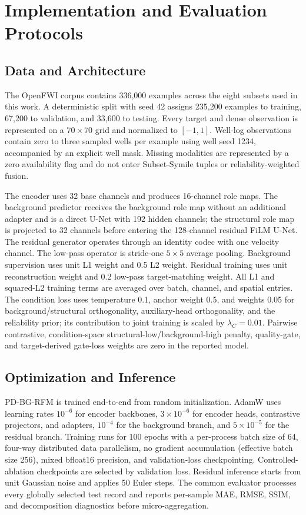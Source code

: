\documentclass[letterpaper]{article}
\begin{document}
\section{Implementation and Evaluation Protocols}
\label{app:implementation}
\subsection{Data and Architecture}
The OpenFWI corpus contains 336,000 examples across the eight subsets used in this work. A deterministic split with seed 42 assigns 235,200 examples to training, 67,200 to validation, and 33,600 to testing. Every target and dense observation is represented on a $70\times70$ grid and normalized to $[-1,1]$. Well-log observations contain zero to three sampled wells per example using well seed 1234, accompanied by an explicit well mask. Missing modalities are represented by a zero availability flag and do not enter Subset-Symile tuples or reliability-weighted fusion.

The encoder uses 32 base channels and produces 16-channel role maps. The background predictor receives the background role map without an additional adapter and is a direct U-Net with 192 hidden channels; the structural role map is projected to 32 channels before entering the 128-channel residual FiLM U-Net. The residual generator operates through an identity codec with one velocity channel. The low-pass operator is stride-one $5\times5$ average pooling. Background supervision uses unit L1 weight and 0.5 L2 weight. Residual training uses unit reconstruction weight and 0.2 low-pass target-matching weight. All L1 and squared-L2 training terms are averaged over batch, channel, and spatial entries. The condition loss uses temperature 0.1, anchor weight 0.5, and weights 0.05 for background/structural orthogonality, auxiliary-head orthogonality, and the reliability prior; its contribution to joint training is scaled by $\lambda_C=0.01$. Pairwise contrastive, condition-space structural-low/background-high penalty, quality-gate, and target-derived gate-loss weights are zero in the reported model.

\subsection{Optimization and Inference}
PD-BG-RFM is trained end-to-end from random initialization. AdamW \cite{loshchilov2019decoupled} uses learning rates $10^{-6}$ for encoder backbones, $3\times10^{-6}$ for encoder heads, contrastive projectors, and adapters, $10^{-4}$ for the background branch, and $5\times10^{-5}$ for the residual branch. Training runs for 100 epochs with a per-process batch size of 64, four-way distributed data parallelism, no gradient accumulation (effective batch size 256), mixed bfloat16 precision, and validation-loss checkpointing. Controlled-ablation checkpoints are selected by validation loss. Residual inference starts from unit Gaussian noise and applies 50 Euler steps. The common evaluator processes every globally selected test record and reports per-sample MAE, RMSE, SSIM, and decomposition diagnostics before micro-aggregation.
\end{document}
